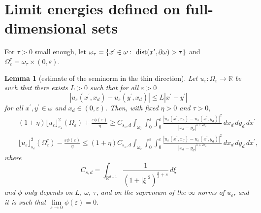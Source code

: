 \documentclass[11pt]{article}
\newtheorem{lemma}[definition]{Lemma}
\def\e{\varepsilon}
\begin{document}
\section{Limit energies defined on full-dimensional sets}
For $\tau>0$ small enough, let $\omega_\tau=\{x^\prime\in\omega: \ \hbox{\rm dist}(x^\prime,\partial\omega)>\tau\}$ and $\Omega_\e^\tau=\omega_\tau\times (0,\e)$. 

\begin{lemma}[estimate of the seminorm in the thin direction]\label{vert-lemma}
Let $u_\e\colon\Omega_\e\to \mathbb R$ be such that there exists $L>0$ such that for all $\e>0$ 
\begin{equation}\label{equilip}
|u_\e(x^\prime, x_d)-u_\e(y^\prime, x_d)|\leq L|x^\prime-y^\prime|
\end{equation}
for all $x^\prime,y^\prime\in\omega$ and $x_d\in (0,\e)$. 
Then, with fixed $\eta>0$ and $\tau>0$,  
\begin{eqnarray}\label{vert-est1}
&&(1+\eta)\lfloor u_\e\rfloor_{s_\e}^2(\Omega_\e)+\frac{\e\phi(\e)}{\eta}\geq C_{s_\e,d} \int_{\omega_\tau}\int_0^\e\int_0^\e\frac{|u_\e(x^\prime, x_d)-u_\e(x^\prime, y_d)|^2}{|x_d-y_d|^{1+2s_\e}}\, dx_d\, dy_d\, dx^\prime\qquad \\
&&\lfloor u_\e\rfloor_{s_\e}^2(\Omega^\tau_\e)-\frac{\e\phi(\e)}{\eta}\leq (1+\eta)C_{s_\e,d} \int_{\omega_\tau}\int_0^\e\int_0^\e\frac{|u_\e(x^\prime, x_d)-u_\e(x^\prime, y_d)|^2}{|x_d-y_d|^{1+2s_\e}}\, dx_d\, dy_d\, dx^\prime,\qquad \label{vert-est2}
\end{eqnarray}
where 
\begin{equation}\label{defC}
C_{s,d}=\int_{\mathbb R^{d-1}}
\frac{1}{(1+|\xi|^2)^{\frac{d}{2}+s}}\, d\xi 
\end{equation}
and $\phi$ only depends on $L$, $\omega$, $\tau$, and on the supremum of the $\infty$ norms of $u_\e$, and it is such that $\lim\limits_{\e\to 0}\phi(\e)=0$. 
\end{lemma}
\end{document}
